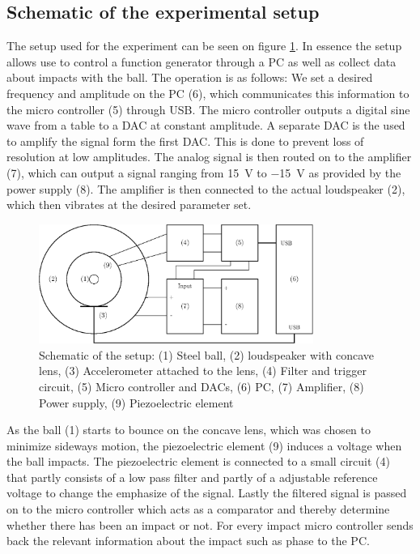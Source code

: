 \documentclass[12pt,oneside,a4paper]{article}
\numberwithin{equation}{section}
\begin{document}
{{{{\subsection{Schematic of the experimental setup}
The setup used for the experiment can be seen on figure \ref{setupdia}. In essence the setup allows use to control a function generator through a PC as well as collect data about impacts with the ball. The operation is as follows: We set a desired frequency and amplitude on the PC (6), which communicates this information to the micro controller (5) through USB. The micro controller outputs a digital sine wave from a table to a DAC at constant amplitude. A separate DAC is the used to amplify the signal form the first DAC. This is done to prevent loss of resolution at low amplitudes. The analog signal is then routed on to the amplifier (7), which can output a signal ranging from \SI{+15}{V} to \SI{-15}{V} as provided by the power supply (8). The amplifier is then connected to the actual loudspeaker (2), which then vibrates at the desired parameter set.
\begin{figure}[h]
	\centering
	\includegraphics[width=0.8\textwidth]{setup}
	\caption{Schematic of the setup: (1) Steel ball, (2) loudspeaker with concave lens, (3) Accelerometer attached to the lens, (4) Filter and trigger circuit, (5) Micro controller and DACs, (6) PC, (7) Amplifier, (8) Power supply, (9) Piezoelectric element}
	\label{setupdia}
\end{figure}
As the ball (1) starts to bounce on the concave lens, which was chosen to minimize sideways motion, the piezoelectric element (9) induces a voltage when the ball impacts. The piezoelectric element is connected to a small circuit (4) that partly consists of a low pass filter and partly of a adjustable reference voltage to change the emphasize of the signal. Lastly the filtered signal is passed on to the micro controller which acts as a comparator and thereby determine whether there has been an impact or not. For every impact micro controller sends back the relevant information about the impact such as phase to the PC.

}}}}
\end{document}
